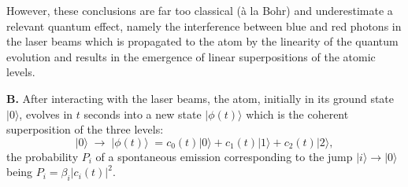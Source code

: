 \documentclass[10pt,a4paper]{article}
\begin{document}
However, these conclusions are far too classical (\`a la Bohr) and
underestimate a relevant quantum effect, namely the interference
between blue and red photons in the laser beams which is
propagated to the atom by the linearity of the quantum evolution
and results in the emergence of linear superpositions of the
atomic levels.

{\bf B.} After interacting with the laser beams, the atom,
initially in its ground state $|0\rangle$, evolves in $t$ seconds
into a new state $|\phi(t)\rangle$ which is the coherent
superposition of the three levels:
\begin{equation}
|0\rangle \; \longrightarrow \; |\phi(t)\rangle \; =
c_{0}(t)|0\rangle + c_{1}(t)|1\rangle + c_{2}(t)|2\rangle,
\end{equation}
the probability $P_{i}$ of a spontaneous emission corresponding to
the jump $|i\rangle \rightarrow |0\rangle$ being $P_{i} =
\beta_{i} |c_{i}(t)|^{2}$.
\end{document}
